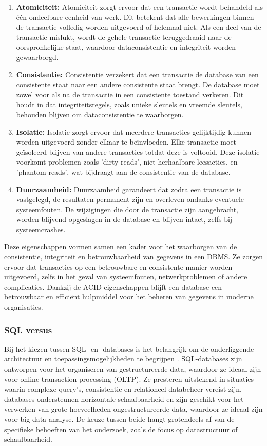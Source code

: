 \begin{enumerate}
    \item \textbf{Atomiciteit:} Atomiciteit zorgt ervoor dat een transactie wordt behandeld als één ondeelbare eenheid van werk. Dit betekent dat alle bewerkingen binnen de transactie volledig worden uitgevoerd of helemaal niet. Als een deel van de transactie mislukt, wordt de gehele transactie teruggedraaid naar de oorspronkelijke staat, waardoor dataconsistentie en integriteit worden gewaarborgd.
    
    \item \textbf{Consistentie:} Consistentie verzekert dat een transactie de database van een consistente staat naar een andere consistente staat brengt. De database moet zowel voor als na de transactie in een consistente toestand verkeren. Dit houdt in dat integriteitsregels, zoals unieke sleutels en vreemde sleutels, behouden blijven om dataconsistentie te waarborgen.
    
    \item \textbf{Isolatie:} Isolatie zorgt ervoor dat meerdere transacties gelijktijdig kunnen worden uitgevoerd zonder elkaar te beïnvloeden. Elke transactie moet geïsoleerd blijven van andere transacties totdat deze is voltooid. Deze isolatie voorkomt problemen zoals 'dirty reads', niet-herhaalbare leesacties, en 'phantom reads', wat bijdraagt aan de consistentie van de database.
    
    \item \textbf{Duurzaamheid:} Duurzaamheid garandeert dat zodra een transactie is vastgelegd, de resultaten permanent zijn en overleven ondanks eventuele systeemfouten. De wijzigingen die door de transactie zijn aangebracht, worden blijvend opgeslagen in de database en blijven intact, zelfs bij systeemcrashes.
\end{enumerate}

Deze eigenschappen vormen samen een kader voor het waarborgen van de consistentie, integriteit en betrouwbaarheid van gegevens in een DBMS. Ze zorgen ervoor dat transacties op een betrouwbare en consistente manier worden uitgevoerd, zelfs in het geval van systeemfouten, netwerkproblemen of andere complicaties. Dankzij de ACID-eigenschappen blijft een database een betrouwbaar en efficiënt hulpmiddel voor het beheren van gegevens in moderne organisaties.
\subsubsection{SQL versus }
Bij het kiezen tussen SQL- en -databases is het belangrijk om de onderliggende architectuur en toepassingsmogelijkheden te begrijpen \autocite{khan2023performance}. SQL-databases zijn ontworpen voor het organiseren van gestructureerde data, waardoor ze ideaal zijn voor online transaction processing (OLTP). Ze presteren uitstekend in situaties waarin complexe query’s, consistentie en relationeel databeheer vereist zijn.-databases ondersteunen horizontale schaalbaarheid en zijn geschikt voor het verwerken van grote hoeveelheden ongestructureerde data, waardoor ze ideaal zijn voor big data-analyse. De keuze tussen beide hangt grotendeels af van de specifieke behoeften van het onderzoek, zoals de focus op datastructuur of schaalbaarheid.

